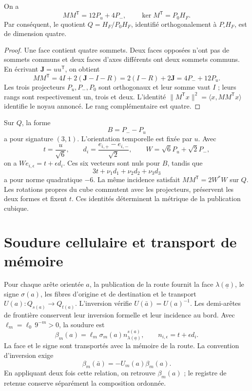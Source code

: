 \begin{proposition}
\label{x_reciprocidad:vii:prop:incidencia}
On a
\[
 MM^{\mathsf T}=12P_u+4P_-,
 \qquad
 \ker M^{\mathsf T}=P_0H_F.
\]
Par conséquent, le quotient
\(Q=H_F/P_0H_F\), identifié orthogonalement à
\(P_\square H_F\), est de dimension quatre.
\end{proposition}

\begin{proof}
Une face contient quatre sommets. Deux faces opposées n'ont pas de sommets
communs et deux faces d'axes différents ont deux sommets communs.
En écrivant \(\mathbf J=uu^{\mathsf T}\), on obtient
\[
 MM^{\mathsf T}=4I+2(\mathbf J-I-R)
 =2(I-R)+2\mathbf J=4P_-+12P_u.
\]
Les trois projecteurs \(P_u,P_-,P_0\) sont orthogonaux et leur somme vaut \(I\) ; leurs rangs sont respectivement un, trois et deux. L'identité \(\|M^{\mathsf T}x\|^2=\langle x,MM^{\mathsf T}x\rangle\) identifie le noyau annoncé. Le rang complémentaire est quatre.
\end{proof}

Sur \(Q\), la forme
\[
 B=P_--P_u
\]
a pour signature \((3,1)\). L'orientation temporelle est fixée par \(u\).
Avec
\[
 t=\frac{u}{\sqrt6},\qquad
 d_i=\frac{e_{i,+}-e_{i,-}}{\sqrt2},\qquad
 W=\sqrt6P_u+\sqrt2P_-,
\]
on a \(We_{i,\epsilon}=t+\epsilon d_i\). Ces six vecteurs
sont nuls pour \(B\), tandis que
\[
 3t+\nu_1d_1+\nu_2d_2+\nu_3d_3
\]
a pour norme quadratique \(-6\). La même incidence satisfait
\(MM^{\mathsf T}=2W^*W\) sur \(Q\). Les rotations propres du cube
commutent avec les projecteurs, préservent les deux formes et fixent \(t\).
Ces identités déterminent la métrique de la publication cubique.

\section{Soudure cellulaire et transport de mémoire}
\label{x_reciprocidad:vii:sec:soldadura-celular}

Pour chaque arête orientée \(a\), la publication de la route fournit
la face \(\lambda(\underline a)\), le signe
\(\sigma(a)\), les fibres d'origine et de destination et le transport
\(U(a):Q_{s(a)}\longrightarrow Q_{t(a)}\).
L'inversion vérifie \(U(\bar a)=U(a)^{-1}\).
Les demi-arêtes de frontière conservent leur inversion formelle et leur incidence
au bord. Avec \(\ell_m=\ell_0\,9^{-m}>0\), la soudure est
\begin{equation}
 \beta_m(a)=\ell_m\sigma_m(a)
              n_{\lambda(\underline a)}^{s(a)},\qquad
 n_{i,\epsilon}=t+\epsilon d_i.
 \label{x_reciprocidad:vii:eq:soldadura-arista}
\end{equation}
La face et le signe sont transportés avec la mémoire de la route. La convention d'inversion exige
\begin{equation}
 \beta_m(\bar a)=-U_m(a)\beta_m(a).
 \label{x_reciprocidad:vii:eq:inversion-soldadura}
\end{equation}
En appliquant deux fois cette relation, on retrouve \(\beta_m(a)\) ; le registre de retenue conserve séparément la composition ordonnée.

